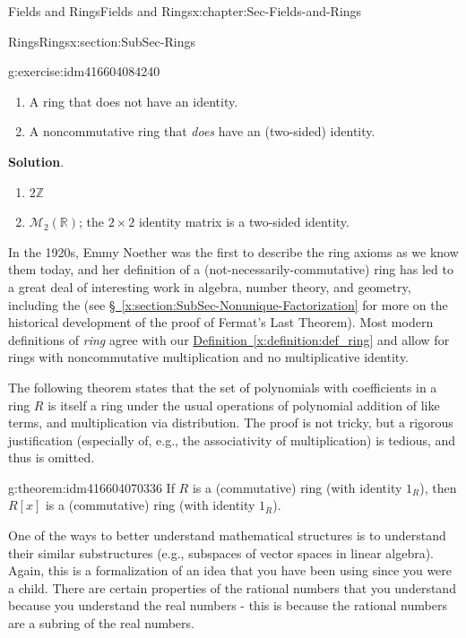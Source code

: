 \documentclass[oneside,10pt,]{book}
\numberwithin{equation}{section}
\def\Z{{\mathbb Z}}
\def\R{{\mathbb R}}
\begin{document}
\begin{chapterptx}{Fields and Rings}{}{Fields and Rings}{}{}{x:chapter:Sec-Fields-and-Rings}
\begin{sectionptx}{Rings}{}{Rings}{}{}{x:section:SubSec-Rings}
\begin{inlineexercise}{}{g:exercise:idm416604084240}
\begin{enumerate}
\item{}A ring that does not have an identity\footnotemark{}.%
\item{}A noncommutative ring that \emph{does} have an (two-sided) identity.%
\end{enumerate}
%
\par\smallskip%
\noindent\textbf{Solution}.\hypertarget{g:solution:idm416604078608}{}\quad{}%
\begin{enumerate}
\item{}\(2\Z\)%
\item{}\(\mathcal{M}_2(\R)\); the \(2\times 2\) identity matrix is a two-sided identity.%
\end{enumerate}
%
\end{inlineexercise}
%
In the 1920s, Emmy Noether was the first to describe the ring axioms as we know them today, and her definition of a (not-necessarily-commutative) ring has led to a great deal of interesting work in algebra, number theory, and geometry, including the (see \hyperref[x:section:SubSec-Nonunique-Factorization]{§~\ref{x:section:SubSec-Nonunique-Factorization}} for more on the historical development of the proof of Fermat's Last Theorem). Most modern definitions of \emph{ring} agree with our \hyperref[x:definition:def_ring]{Definition~\ref{x:definition:def_ring}} and allow for rings with noncommutative multiplication and no multiplicative identity.%
\par
The following theorem states that the set of polynomials with coefficients in a ring \(R\) is itself a ring under the usual operations of polynomial addition of like terms, and multiplication via distribution. The proof is not tricky, but a rigorous justification (especially of, e.g., the associativity of multiplication) is tedious, and thus is omitted.%
\begin{theorem}{}{}{g:theorem:idm416604070336}%
If \(R\) is a (commutative) ring (with identity \(1_R\)), then \(R[x]\) is a (commutative) ring (with identity \(1_R\)).%
\end{theorem}
One of the ways to better understand mathematical structures is to understand their similar substructures (e.g., subspaces of vector spaces in linear algebra). Again, this is a formalization of an idea that you have been using since you were a child. There are certain properties of the rational numbers that you understand because you understand the real numbers - this is because the rational numbers are a subring of the real numbers.%

\end{sectionptx}
\end{chapterptx}
\end{document}
